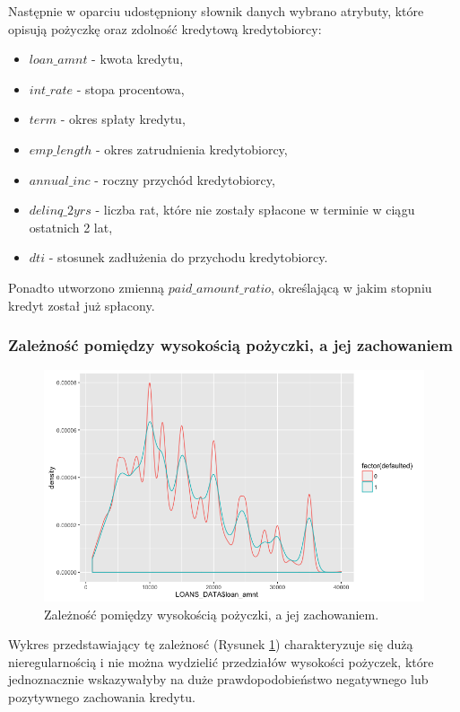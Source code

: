 Następnie w oparciu udostępniony słownik danych \cite{LendingClub} wybrano atrybuty, które opisują pożyczkę oraz zdolność kredytową kredytobiorcy:

\begin{itemize}
	\item $loan\_amnt$ - kwota kredytu,
	\item $int\_rate$ - stopa procentowa,
	\item $term$ - okres spłaty kredytu,
	\item $emp\_length$ - okres zatrudnienia kredytobiorcy,
	\item $annual\_inc$ - roczny przychód kredytobiorcy,
	\item $delinq\_2yrs$ - liczba rat, które nie zostały spłacone w terminie w ciągu ostatnich 2 lat,
	\item $dti$ - stosunek zadłużenia do przychodu kredytobiorcy.
\end{itemize}

Ponadto utworzono zmienną $paid\_amount\_ratio$, określającą w jakim stopniu kredyt został już spłacony.

\subsubsection{Zależność pomiędzy wysokością pożyczki, a jej zachowaniem}

\begin{figure}[h] \centering %
	\includegraphics[scale=0.5]{img/amt_defaulted.png}
	\caption{Zależność pomiędzy wysokością pożyczki, a jej zachowaniem.}
	\label{lc:amt_defaulted}
\end{figure}

Wykres przedstawiający tę zależnosć (Rysunek \ref{lc:amt_defaulted}) charakteryzuje się dużą nieregularnością i nie można wydzielić przedziałów wysokości pożyczek, które jednoznacznie wskazywałyby na duże prawdopodobieństwo negatywnego lub pozytywnego zachowania kredytu.

